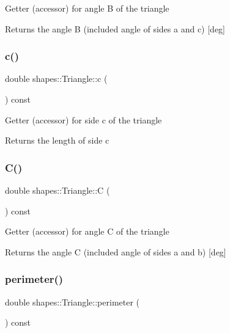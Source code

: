 Getter (accessor) for angle B of the triangle

\begin{DoxyReturn}{Returns}
the angle B (included angle of sides a and c) \mbox{[}deg\mbox{]} 
\end{DoxyReturn}
\mbox{\label{classshapes_1_1Triangle_a9d52acfa086b1bfd664c12ab09a75d89}} 
\subsubsection{\texorpdfstring{c()}{c()}}
{\footnotesize\ttfamily double shapes\+::\+Triangle\+::c (\begin{DoxyParamCaption}{ }\end{DoxyParamCaption}) const\hspace{0.3cm}{\ttfamily [inline]}}

Getter (accessor) for side c of the triangle

\begin{DoxyReturn}{Returns}
the length of side c 
\end{DoxyReturn}
\mbox{\label{classshapes_1_1Triangle_aba40e175fdf19b46830c2138fceff821}} 
\subsubsection{\texorpdfstring{C()}{C()}}
{\footnotesize\ttfamily double shapes\+::\+Triangle\+::C (\begin{DoxyParamCaption}{ }\end{DoxyParamCaption}) const\hspace{0.3cm}{\ttfamily [inline]}}

Getter (accessor) for angle C of the triangle

\begin{DoxyReturn}{Returns}
the angle C (included angle of sides a and b) \mbox{[}deg\mbox{]} 
\end{DoxyReturn}
\mbox{\label{classshapes_1_1Triangle_a79c8a69fd152f3af3436364db0212aec}} 
\subsubsection{\texorpdfstring{perimeter()}{perimeter()}}
{\footnotesize\ttfamily double shapes\+::\+Triangle\+::perimeter (\begin{DoxyParamCaption}{ }\end{DoxyParamCaption}) const\hspace{0.3cm}{\ttfamily [inline]}}

